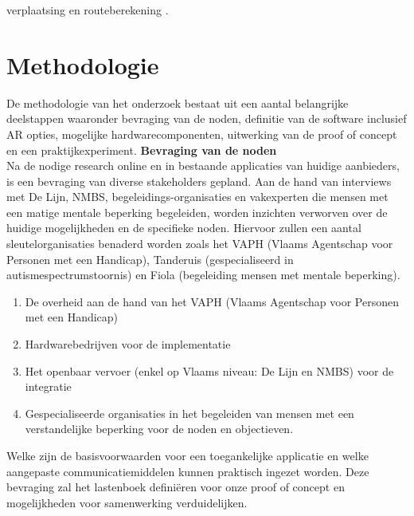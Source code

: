 \documentclass{hogent-article}
\begin{document}
verplaatsing en routeberekening \autocite{Fatnassi2015}.
    
    \section{Methodologie}%
    \label{sec:methodologie}
    
    De methodologie van het onderzoek bestaat uit een aantal belangrijke deelstappen waaronder bevraging van de noden, definitie van de software inclusief AR opties, mogelijke hardwarecomponenten, uitwerking van de proof of concept en een praktijkexperiment.
    \textbf{Bevraging van de noden} \\
    Na de nodige research online en in bestaande applicaties van huidige aanbieders, is een bevraging van diverse stakeholders gepland. Aan de hand van interviews met De Lijn, NMBS, begeleidings-organisaties en vakexperten die mensen met een matige mentale beperking begeleiden, worden inzichten verworven over de huidige mogelijkheden en de specifieke noden. Hiervoor zullen een aantal sleutelorganisaties benaderd worden zoals het VAPH (Vlaams Agentschap voor Personen met een Handicap), Tanderuis (gespecialiseerd in autismespectrumstoornis) en Fiola (begeleiding mensen met mentale beperking).
    \begin{enumerate}
        \item De overheid aan de hand van het VAPH (Vlaams Agentschap voor Personen met een Handicap)
        \item Hardwarebedrijven voor de implementatie
        \item Het openbaar vervoer (enkel op Vlaams niveau: De Lijn en NMBS) voor de integratie
        \item Gespecialiseerde organisaties in het begeleiden van mensen met een verstandelijke beperking voor de noden en objectieven.
    \end{enumerate}
    Welke zijn de basisvoorwaarden voor een toegankelijke applicatie en welke aangepaste communicatiemiddelen kunnen praktisch ingezet worden. Deze bevraging zal het lastenboek definiëren voor onze proof of concept en mogelijkheden voor samenwerking verduidelijken. 
    
\end{document}
